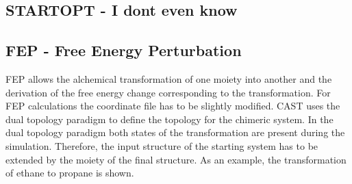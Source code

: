 \documentclass[10pt,a4paper]{article} %
\newif\ifdevmode %
\begin{document}
	\subsection{STARTOPT - I dont even know}	
	\ifdevmode \colorbox{red}{write something here} \fi	

	\subsection{FEP - Free Energy Perturbation}
	\acf{FEP} allows the alchemical transformation of one moiety into another and the derivation of the free energy change corresponding to the transformation. For \ac{FEP} calculations the coordinate file has to be slightly modified. \ac{CAST} uses the dual topology paradigm to define the topology for the chimeric system. In the dual topology paradigm both states of the transformation are present during the simulation. Therefore, the input structure of the starting system has to be extended by the moiety of the final structure. As an example, the transformation of ethane to propane is shown. \\
\end{document}
